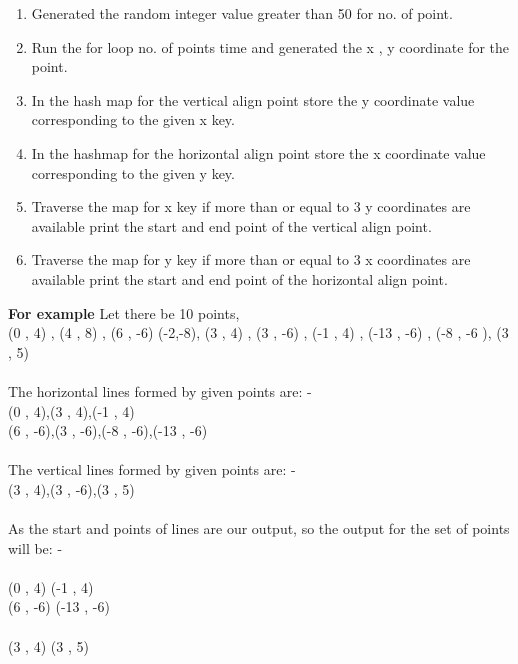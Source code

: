 \documentclass[conference]{IEEEtran}
\begin{document}
\begin{enumerate}
\item Generated the random integer value greater than 50 for no. of  point.\\

\item Run the for  loop no. of points time and generated the x , y coordinate for the point.\\

\item In the hash map for the vertical align point store the y coordinate value corresponding to the given x key.\\

\item In the hashmap for the horizontal align point store the x coordinate value corresponding to the given y key.
\\

\item Traverse the map for  x key if more than or equal to  3 y coordinates are available print the start and end point of the vertical align point. \\

\item Traverse the map for  y key if more than or equal to  3 x coordinates are available print the start and end point of the horizontal align point.
\\ 

\end{enumerate}
\textbf{For example} Let there be 10 points,\\
            (0 ,  4) , (4 , 8) , (6 , -6) (-2,-8), (3 , 4) , (3 , -6) , (-1 , 4) , (-13 , -6) , (-8 , -6 ), (3 , 5)\\
\\The horizontal lines formed by given points are: - \\
     {(0 , 4),(3 , 4),(-1 , 4)}\\
     {(6 , -6),(3 , -6),(-8 , -6),(-13 , -6)}\\
\\The vertical lines formed by given points are: -\\
     {(3 , 4),(3 , -6),(3 , 5)} \\
\\As the start and points of lines are our output, so the output for the set of points will be: -\\
\\ (0 , 4) (-1 , 4)
\\ (6 , -6) (-13 , -6)\\
\\(3 , 4) (3 , 5)\\
\end{document}
